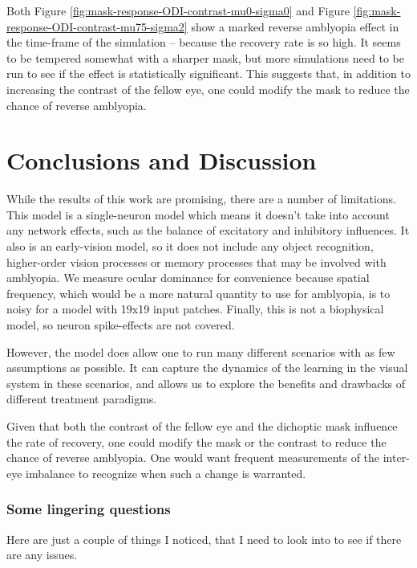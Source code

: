 \documentclass[
  onecolumn]{article}
\begin{document}
Both Figure \ref{fig:mask-response-ODI-contrast-mu0-sigma0} and Figure
\ref{fig:mask-response-ODI-contrast-mu75-sigma2} show a marked reverse
amblyopia effect in the time-frame of the simulation -- because the
recovery rate is so high. It seems to be tempered somewhat with a
sharper mask, but more simulations need to be run to see if the effect
is statistically significant. This suggests that, in addition to
increasing the contrast of the fellow eye, one could modify the mask to
reduce the chance of reverse amblyopia.

\hypertarget{conclusions-and-discussion}{%
\section{Conclusions and Discussion}\label{conclusions-and-discussion}}

While the results of this work are promising, there are a number of
limitations. This model is a single-neuron model which means it doesn't
take into account any network effects, such as the balance of excitatory
and inhibitory influences. It also is an early-vision model, so it does
not include any object recognition, higher-order vision processes or
memory processes that may be involved with amblyopia. We measure ocular
dominance for convenience because spatial frequency, which would be a
more natural quantity to use for amblyopia, is to noisy for a model with
19x19 input patches. Finally, this is not a biophysical model, so neuron
spike-effects are not covered.

However, the model does allow one to run many different scenarios with
as few assumptions as possible. It can capture the dynamics of the
learning in the visual system in these scenarios, and allows us to
explore the benefits and drawbacks of different treatment paradigms.

Given that both the contrast of the fellow eye and the dichoptic mask
influence the rate of recovery, one could modify the mask or the
contrast to reduce the chance of reverse amblyopia. One would want
frequent measurements of the inter-eye imbalance to recognize when such
a change is warranted.

\hypertarget{some-lingering-questions}{%
\subsubsection{Some lingering
questions}\label{some-lingering-questions}}

Here are just a couple of things I noticed, that I need to look into to
see if there are any issues.
\end{document}
